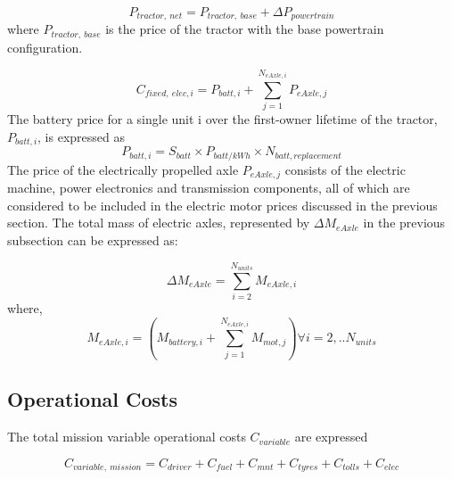 \documentclass[ExampleMasters.tex]{subfiles}
\begin{document}
			\begin{equation}
				P_{tractor,\ net} = P_{tractor,\ base} + \Delta P_{powertrain}
			\end{equation}
			where $P_{tractor,\ base}$  is the price of the tractor with the base powertrain configuration. 

			\begin{equation}
				C_{fixed,\ elec, i} = P_{batt,i}+\displaystyle \sum_{j=1}^{N_{eAxle,i}} P_{eAxle,j}
			\end{equation}
			   The battery price for a single unit i over the first-owner lifetime of the tractor, $P_{batt,i}$, is expressed as
			\begin{equation}
				P_{batt,i}= S_{batt} \times P_{batt/kWh} \times N_{batt, replacement}
			\end{equation}
			  The price of the electrically propelled axle $P_{eAxle,j}$ consists of the electric machine, power electronics and transmission components, all of which are considered to be included in the electric motor prices discussed in the previous section. The total mass of electric axles, represented by $\Delta M_{eAxle}$ in the previous subsection can be expressed as:

			\begin{equation}
				\Delta M_{eAxle} = \displaystyle \sum_{i=2}^{N_{units}} M_{eAxle,i}
			\end{equation}
			 where, 
			\begin{equation}
				M_{eAxle,i} = (M_{battery,i} + \sum_{j=1}^{N_{eAxle,i}} M_{mot,j}) \forall i=2,..N_{units}
			\end{equation}

		\subsection{Operational Costs}
			The total mission variable operational costs $C_{variable}$ are expressed
			
			\begin{equation}
				C_{variable,\ mission} = C_{driver} + C_{fuel} + C_{mnt} + C_{tyres} + C_{tolls} + C_{elec}
			\end{equation}
\end{document}

